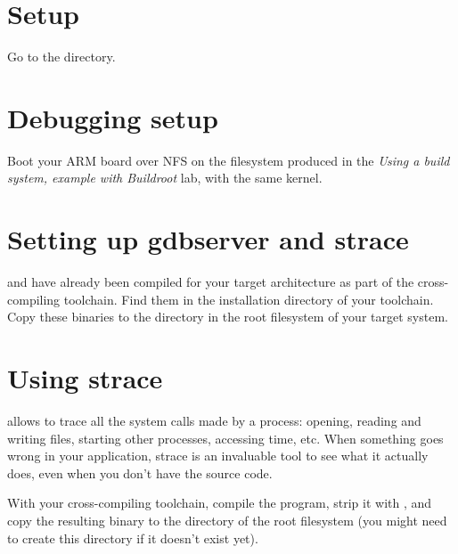 
\section{Setup}

Go to the  directory.

\section{Debugging setup}

Boot your ARM board over NFS on the filesystem produced in the {\em
  Using a build system, example with Buildroot} lab, with the same kernel.

\section{Setting up gdbserver and strace}

 and  have already been
compiled for your target architecture as part of the cross-compiling
toolchain. Find them in the installation directory of your
toolchain. Copy these binaries to the  directory in
the root filesystem of your target system.

\section{Using strace}

 allows to trace all the system calls made by a process:
opening, reading and writing files, starting other processes,
accessing time, etc. When something goes wrong in your application,
strace is an invaluable tool to see what it actually does, even when
you don't have the source code.

With your cross-compiling toolchain, compile the
 program, strip it with ,
and copy the resulting binary to
the  directory of the root filesystem (you might need to create
this directory if it doesn't exist yet).

